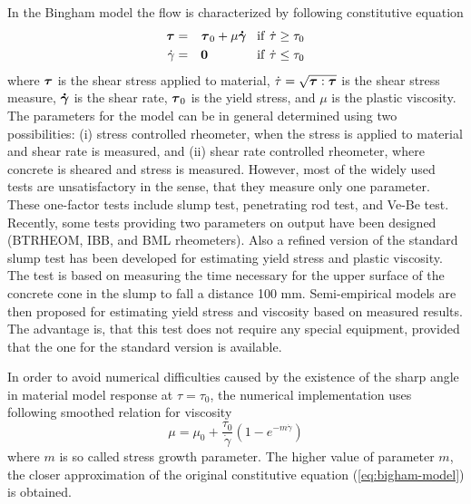 \documentclass[a4paper]{article}
\newcommand{\mbf}[1]{\mbox{\boldmath$#1$}}
\newcommand{\del}[2]{\mbox{$\displaystyle\frac{#1}{#2}$}}
\begin{document}
In the Bingham model the flow is characterized by following
constitutive equation
\begin{eqnarray}
  \label{eq:bigham-model}
  \mbf{\tau}&=&\mbf{\tau}_0+\mu\mbf{\dot\gamma}\;\;\;\rm{if}\
  \dot\tau\ge\tau_0\\
  \dot\gamma &=& \mbf{0}\;\;\;\;\;\;\;\;\;\;\;\;\;\;\rm{if}\ \dot\tau\le\tau_0
\end{eqnarray}
where $\mbf{\tau}$ is the shear stress applied to material, $\dot\tau=\sqrt{\mbf{\tau}:\mbf{\tau}}$
is the shear stress measure, $\mbf{\dot\gamma}$ is
the shear rate, $\mbf{\tau}_0$ is the yield stress, and $\mu$ is the plastic
viscosity.
The parameters for the model can be in general determined using two
possibilities: (i) stress controlled rheometer, when the stress is applied
to material and shear rate is measured, and (ii) shear rate controlled
rheometer, where concrete is sheared and stress is measured. However,
most of the widely used tests are unsatisfactory in the sense, that
they measure only one parameter. These one-factor tests include slump
test, penetrating rod test, and Ve-Be test. Recently, some tests
providing two parameters on output have been designed (BTRHEOM, IBB,
and BML rheometers). Also a refined version of the
standard slump test has been developed for estimating yield stress and
plastic viscosity. The test is based on measuring the time necessary
for the upper surface of the concrete cone in the slump to fall a
distance 100 mm. Semi-empirical models are then proposed for estimating
yield stress and viscosity based on measured results. The advantage
is, that this test does not require any special equipment, provided that
the one for the standard version is available.

In order to avoid numerical difficulties caused by the existence of
the sharp angle in material model
response at $\tau=\tau_0$, the numerical implementation uses
following smoothed relation for viscosity
\begin{equation}
\label{eq:smooth-bigham-model}
\mu=\mu_0+\del{\tau_0}{\dot\gamma}(1-e^{-m\dot\gamma})
\end{equation}
where $m$ is so called stress growth parameter. The higher value of
parameter $m$, the closer approximation of the original
constitutive equation (\ref{eq:bigham-model}) is obtained.
%
%
\end{document}
